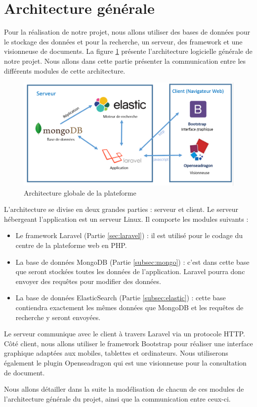 \newpage
\section{Architecture générale}
\label{sec:generale}

Pour la réalisation de notre projet, nous allons utiliser des bases de données pour le stockage des données et pour la recherche, un serveur, des framework et une visionneuse de documents. La figure \ref{archi} présente l'architecture logicielle générale de notre projet. Nous allons dans cette partie présenter la communication entre les différents modules de cette architecture.
    \begin{figure}[H]
        \centering
        \includegraphics[width=\textwidth]{figure/Archi.png}
            \caption{Architecture globale de la plateforme}
            \label{archi}
    \end{figure}

L'architecture se divise en deux grandes parties : serveur et client. 
Le serveur hébergeant l'application est un serveur Linux. Il comporte les modules suivants :
\begin{itemize}
	\item Le framework Laravel (Partie \ref{sec:laravel}) : il est utilisé pour le codage du centre de la plateforme web en PHP.
	\item La base de données MongoDB (Partie \ref{subsec:mongo}) : c'est dans cette base que seront stockées toutes les données de l'application. Laravel pourra donc envoyer des requêtes pour modifier des données.
	\item La base de données ElasticSearch (Partie \ref{subsec:elastic}) : cette base contiendra exactement les mêmes données que MongoDB et les requêtes de recherche y seront envoyées.
\end{itemize}

Le serveur communique avec le client à travers Laravel via un protocole HTTP. Côté client, nous allons utiliser le framework Bootstrap pour réaliser une interface graphique adaptées aux mobiles, tablettes et ordinateurs. Nous utiliserons également le plugin Openseadragon qui est une visionneuse pour la consultation de document. 

Nous allons détailler dans la suite la modélisation de chacun de ces modules de l'architecture générale du projet, ainsi que la communication entre ceux-ci.
